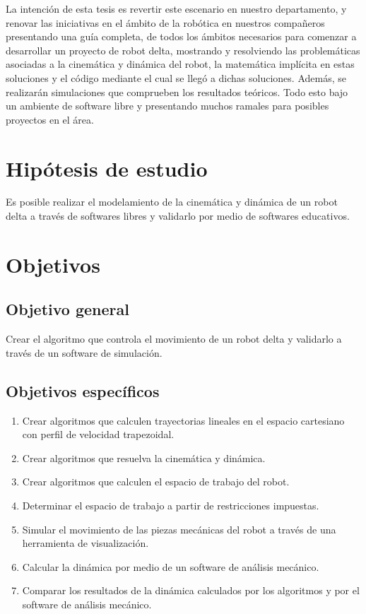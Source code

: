La intención de esta tesis es revertir este escenario en nuestro departamento, y renovar las iniciativas en el ámbito de la robótica en nuestros compañeros presentando una guía completa, de todos los ámbitos necesarios para comenzar a desarrollar un proyecto de robot delta, mostrando y resolviendo las problemáticas asociadas a la cinemática y dinámica del robot, la matemática implícita en estas soluciones y el código mediante el cual se llegó a dichas soluciones. Además, se realizarán simulaciones que comprueben los resultados teóricos. Todo esto bajo un ambiente de software libre y presentando muchos ramales para posibles proyectos en el área.

\section{Hipótesis de estudio}
Es posible realizar el modelamiento de la cinemática y dinámica de un robot delta a través de softwares libres y validarlo por medio de softwares educativos.

\section{Objetivos}

    \subsection{Objetivo general}
        Crear el algoritmo que controla el movimiento de un robot delta y validarlo a través de un software de simulación.
\subsection{Objetivos específicos}
\begin{enumerate}
    \item {Crear algoritmos que calculen trayectorias lineales en el espacio cartesiano con perfil de velocidad trapezoidal.}
    \item {Crear algoritmos que resuelva la cinemática y dinámica.}
    \item {Crear algoritmos que calculen el espacio de trabajo del robot.}
    \item {Determinar el espacio de trabajo a partir de restricciones impuestas.}
    \item {Simular el movimiento de las piezas mecánicas del robot a través de una herramienta de visualización.}
    \item {Calcular la dinámica por medio de un software de análisis mecánico.}
    \item {Comparar los resultados de la dinámica calculados por los algoritmos y por el software de análisis mecánico. }
\end{enumerate}

